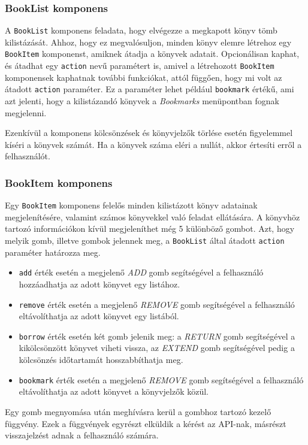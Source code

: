\subsubsection{BookList komponens}

A \texttt{BookList} komponens feladata, hogy elvégezze a megkapott könyv tömb kilistázását. Ahhoz, hogy ez megvalósuljon, minden könyv elemre létrehoz egy \texttt{BookItem} komponenst, amiknek átadja a könyvek adatait. Opcionálisan kaphat, és átadhat egy \texttt{action} nevű paramétert is, amivel a létrehozott \texttt{BookItem} komponensek kaphatnak további funkciókat, attól függően, hogy mi volt az átadott \texttt{action} paraméter. Ez a paraméter lehet például \texttt{bookmark} értékű, ami azt jelenti, hogy a kilistázandó könyvek a \textit{Bookmarks} menüpontban fognak megjelenni.

Ezenkívül a komponens kölcsönzések és könyvjelzők törlése esetén figyelemmel kíséri a könyvek számát. Ha a könyvek száma eléri a nullát, akkor értesíti erről a felhasználót.

\subsubsection{BookItem komponens}

Egy \texttt{BookItem} komponens felelős minden kilistázott könyv adatainak megjelenítésére, valamint számos könyvekkel való feladat ellátására. A könyvhöz tartozó információkon kívül megjeleníthet még 5 különböző gombot. Azt, hogy melyik gomb, illetve gombok jelennek meg, a \texttt{BookList} által átadott \texttt{action} paraméter határozza meg.
\begin{itemize}
    \item \texttt{add} érték esetén a megjelenő \textit{ADD} gomb segítségével a felhasználó hozzáadhatja az adott könyvet egy listához.
    \item \texttt{remove} érték esetén a megjelenő \textit{REMOVE} gomb segítségével a felhasználó eltávolíthatja az adott könyvet egy listából.
    \item \texttt{borrow} érték esetén két gomb jelenik meg: a \textit{RETURN} gomb segítségével a kikölcsönzött könyvet viheti vissza, az \textit{EXTEND} gomb segítségével pedig a kölcsönzés időtartamát hosszabbíthatja meg.
    \item \texttt{bookmark} érték esetén a megjelenő \textit{REMOVE} gomb segítségével a felhasználó eltávolíthatja az adott könyvet a könyvjelzők közül.
\end{itemize}
Egy gomb megnyomása után meghívásra kerül a gombhoz tartozó kezelő függvény. Ezek a függvények egyrészt elküldik a kérést az API-nak, másrészt visszajelzést adnak a felhasználó számára.

